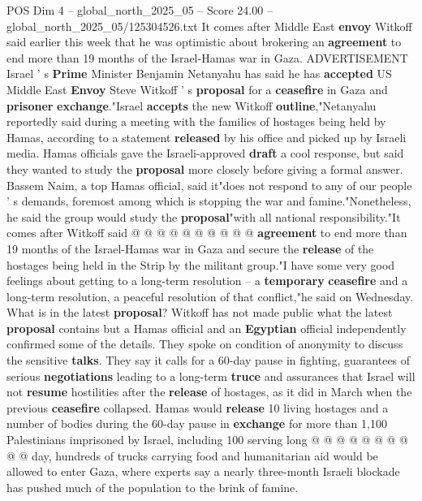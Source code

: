 \begin{textsample}{POS Dim 4 – global\_north\_2025\_05 – Score 24.00 – global\_north\_2025\_05/125304526.txt}  \label{ex:f4_pos_200}
It comes after Middle East \textbf{envoy} Witkoff said earlier this week that he was optimistic about brokering an \textbf{agreement} to end more than 19 months of the Israel-Hamas war in Gaza.
ADVERTISEMENT Israel ' s \textbf{Prime} Minister Benjamin Netanyahu has said he has \textbf{accepted} US Middle East \textbf{Envoy} Steve Witkoff ' s \textbf{proposal} for a \textbf{ceasefire} in Gaza and \textbf{prisoner} \textbf{exchange}."Israel \textbf{accepts} the new Witkoff \textbf{outline},"Netanyahu reportedly said during a meeting with the families of hostages being held by Hamas, according to a statement \textbf{released} by his office and picked up by Israeli media.
Hamas officials gave the Israeli-approved \textbf{draft} a cool response, but said they wanted to study the \textbf{proposal} more closely before giving a formal answer.
Bassem Naim, a top Hamas official, said it"does not respond to any of our people ' s demands, foremost among which is stopping the war and famine."Nonetheless, he said the group would study the \textbf{proposal}"with all national responsibility."It comes after Witkoff said @ @ @ @ @ @ @ @ @ @ \textbf{agreement} to end more than 19 months of the Israel-Hamas war in Gaza and secure the \textbf{release} of the hostages being held in the Strip by the militant group."I have some very good feelings about getting to a long-term resolution -- a \textbf{temporary} \textbf{ceasefire} and a long-term resolution, a peaceful resolution of that conflict,"he said on Wednesday.
What is in the latest \textbf{proposal}?
Witkoff has not made public what the latest \textbf{proposal} contains but a Hamas official and an \textbf{Egyptian} official independently confirmed some of the details.
They spoke on condition of anonymity to discuss the sensitive \textbf{talks}.
They say it calls for a 60-day pause in fighting, guarantees of serious \textbf{negotiations} leading to a long-term \textbf{truce} and assurances that Israel will not \textbf{resume} hostilities after the \textbf{release} of hostages, as it did in March when the previous \textbf{ceasefire} collapsed.
Hamas would \textbf{release} 10 living hostages and a number of bodies during the 60-day pause in \textbf{exchange} for more than 1,100 Palestinians imprisoned by Israel, including 100 serving long @ @ @ @ @ @ @ @ @ @ day, hundreds of trucks carrying food and humanitarian aid would be allowed to enter Gaza, where experts say a nearly three-month Israeli blockade has pushed much of the population to the brink of famine.

\end{textsample}
